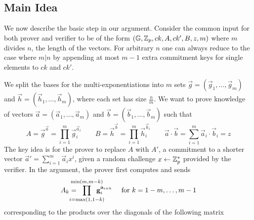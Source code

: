 \subsection{Main Idea}
We now describe the basic step in our argument.
Consider the common input for both prover and verifier to be of the form $(\mathbb{G},\mathbb{Z}_p,ck,A,ck',B,z,m)$ where $m$ divides $n$, the length of the vectors. For arbitrary $n$ one can always reduce to the case where $m|n$ by appending at most $m-1$ extra commitment keys for single elements to $ck$ and $ck'$.

We split the bases for the multi-exponentiations into $m$ sets $\vec{g}=(\vec{g}_1,\ldots,\vec{g}_m)$ and $\vec{h}=(\vec{h}_1,\ldots,\vec{h}_m)$, where each set has size $\frac{n}{m}$.
%
We want to prove knowledge of vectors $\vec{a}=(\vec{a}_1,\ldots,\vec{a}_m)$ and $\vec{b}=(\vec{b}_1,\ldots,\vec{b}_m)$ such that $$A=\vec{g}^{\vec{a}}=\prod_{i=1}^m\vec{g}_i^{\vec{a}_i}\qquad B=\vec{h}^{\vec{b}}=\prod_{i=1}^m\vec{h}_i^{\vec{b}_i} \qquad \vec{a}\cdot \vec{b}=\sum_{i=1}^m \vec{a}_i \cdot \vec{b}_i=z$$ 
%
%
The key idea is for the prover to replace  $A$ with  $A'$, a commitment to a shorter vector $\vec{a}'=\sum_{i=1}^m\vec{a}_ix^i$, given a random challenge $x\gets \mathbb{Z}_p^*$ provided by the verifier.
In the argument, the prover first computes and sends 
$$A_k=\mkern-24mu\prod_{i=\max(1,1-k)}^{\min(m,m-k)}\mkern-24mu\vec{g}_i^{\vec{a}_{i+k}} \quad \text{  for   } k=1-m,\ldots, m-1$$ corresponding to the products over the diagonals of the following matrix



\newcommand\LGRAY{\color{lgray}}





